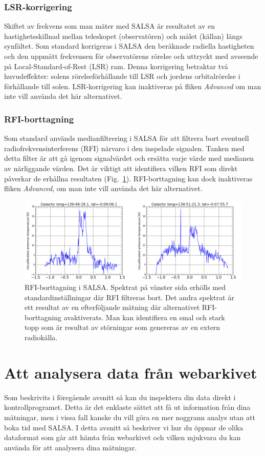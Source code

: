 \subsubsection{LSR-korrigering}
Skiftet av frekvens som man mäter med SALSA är resultatet av
en hastighetsskillnad mellan teleskopet (observatören) och målet (källan)
längs synfältet. Som standard korrigeras i SALSA den beräknade radiella hastigheten och den uppmätt frekvensen
för observatörens rörelse och uttryckt med avseende på Local-Standard-of-Rest (LSR)
ram. Denna korrigering betraktar två huvudeffekter: solens rörelseförhållande
till LSR och jordens orbitalrörelse i förhållande till solen. LSR-korrigering kan inaktiveras på fliken \emph {Advanced}
om man inte vill använda det här alternativet.
\subsubsection{RFI-borttagning}
Som standard används medianfiltrering i SALSA för att filtrera bort eventuell radiofrekvensinterferens (RFI)
närvaro i den inspelade signalen. Tanken med detta filter är att gå igenom signalvärdet och
ersätta varje värde med medianen av närliggande värden. Det är viktigt att identifiera vilken RFI som direkt
påverkar de erhållna resultaten (Fig.~\ref{fig:RFIremoval}). RFI-borttagning kan dock inaktiveras
fliken \emph {Advanced}, om man inte vill använda det här alternativet.
\begin{figure}[ht]
\begin{center}
\includegraphics[width=\textwidth]{../figures/RFIremoval.png}
\end{center}
\caption{
RFI-borttagning i SALSA. Spektrat på vänster sida erhölls med standardinställningar där RFI filtreras bort.
Det andra spektrat är ett resultat av en efterföljande mätning där alternativet RFI-borttagning avaktiverats. 
Man kan identifiera en smal och stark topp som är resultat av störningar som genereras av en extern radiokälla.}
\label{fig:RFIremoval}
\end{figure}
\section{Att analysera data från webarkivet}
\label{sect:archiveprocess}
Som beskrivits i föregående avsnitt så kan du inspektera din data direkt i
kontrollprogramet. Detta är det enklaste sättet att få ut information
från dina mätningar, men i vissa fall kanske du vill göra en mer noggrann analys
utan att boka tid med SALSA. I detta avsnitt så beskriver vi hur du öppnar
de olika dataformat som går att hämta från webarkivet och vilken mjukvara
du kan använda för att analysera dina mätningar.


